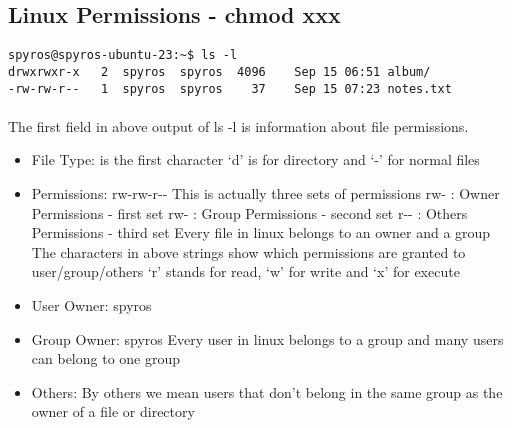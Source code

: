 \documentclass{article}
\begin{document}
\subsection{Linux Permissions - chmod xxx}
\begin{lstlisting}
spyros@spyros-ubuntu-23:~$ ls -l
drwxrwxr-x	 2	spyros	spyros	4096	Sep 15 06:51 album/
-rw-rw-r--	 1	spyros	spyros	  37	Sep 15 07:23 notes.txt

\end{lstlisting}
\paragraph{} The first field in above output of ls -l is information about file permissions.
\begin{itemize}
	\item File Type: is the first character
		\subitem `d' is for directory and `-' for normal files
	\item Permissions: rw-rw-r-{}-
		\subitem This is actually three sets of permissions
		\subitem rw- : Owner Permissions - first set
		\subitem rw- : Group Permissions - second set
		\subitem r-{}- {} : Others Permissions - third set
		\subitem Every file in linux belongs to an owner and a group
		\subitem The characters in above strings show which permissions are granted to user/group/others
		\subitem `r' stands for read, `w' for write and `x' for execute
	\item User Owner: spyros
	\item Group Owner: spyros
		\subitem Every user in linux belongs to a group and many users can belong to one group
	\item Others: By others we mean users that don't belong in the same group as the owner of a file or directory
\end{itemize}
\end{document}
